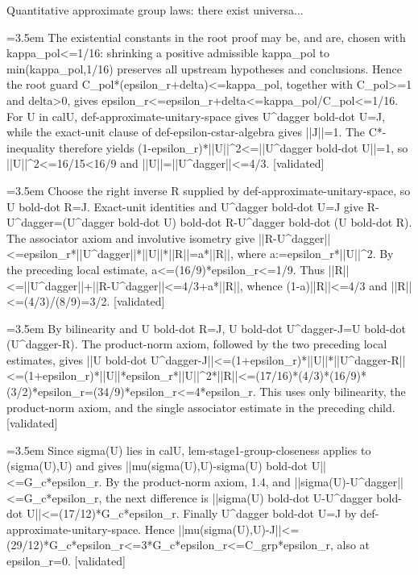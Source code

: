 \documentclass{article}
\newcommand{\step}[1]{\par\noindent\hangindent=3.5em\hangafter=1%
  \makebox[3.5em][l]{\textbf{#1.}}}
\newcommand{\steptag}[1]{\hfill{\small\textsf{[#1]}}}
\begin{document}
\begin{proofbox}{Quantitative approximate group laws: there exist universa...}
\step{1.6.1} The existential constants in the root proof may be, and are, chosen with kappa\_pol<=1/16: shrinking a positive admissible kappa\_pol to min(kappa\_pol,1/16) preserves all upstream hypotheses and conclusions. Hence the root guard C\_pol*(epsilon\_r+delta)<=kappa\_pol, together with C\_pol>=1 and delta>0, gives epsilon\_r<=epsilon\_r+delta<=kappa\_pol/C\_pol<=1/16. For U in calU, def-approximate-unitary-space gives U\textasciicircum{}dagger bold-dot U=J, while the exact-unit clause of def-epsilon-cstar-algebra gives ||J||=1. The C*-inequality therefore yields (1-epsilon\_r)*||U||\textasciicircum{}2<=||U\textasciicircum{}dagger bold-dot U||=1, so ||U||\textasciicircum{}2<=16/15<16/9 and ||U||=||U\textasciicircum{}dagger||<=4/3. \steptag{validated} \\[4pt]
\step{1.6.2} Choose the right inverse R supplied by def-approximate-unitary-space, so U bold-dot R=J. Exact-unit identities and U\textasciicircum{}dagger bold-dot U=J give R-U\textasciicircum{}dagger=(U\textasciicircum{}dagger bold-dot U) bold-dot R-U\textasciicircum{}dagger bold-dot (U bold-dot R). The associator axiom and involutive isometry give ||R-U\textasciicircum{}dagger||<=epsilon\_r*||U\textasciicircum{}dagger||*||U||*||R||=a*||R||, where a:=epsilon\_r*||U||\textasciicircum{}2. By the preceding local estimate, a<=(16/9)*epsilon\_r<=1/9. Thus ||R||<=||U\textasciicircum{}dagger||+||R-U\textasciicircum{}dagger||<=4/3+a*||R||, whence (1-a)||R||<=4/3 and ||R||<=(4/3)/(8/9)=3/2. \steptag{validated} \\[4pt]
\step{1.6.3} By bilinearity and U bold-dot R=J, U bold-dot U\textasciicircum{}dagger-J=U bold-dot (U\textasciicircum{}dagger-R). The product-norm axiom, followed by the two preceding local estimates, gives ||U bold-dot U\textasciicircum{}dagger-J||<=(1+epsilon\_r)*||U||*||U\textasciicircum{}dagger-R||<=(1+epsilon\_r)*||U||*epsilon\_r*||U||\textasciicircum{}2*||R||<=(17/16)*(4/3)*(16/9)*(3/2)*epsilon\_r=(34/9)*epsilon\_r<=4*epsilon\_r. This uses only bilinearity, the product-norm axiom, and the single associator estimate in the preceding child. \steptag{validated} \\[4pt]
\step{1.7} Since sigma(U) lies in calU, lem-stage1-group-closeness applies to (sigma(U),U) and gives ||mu(sigma(U),U)-sigma(U) bold-dot U||<=G\_c*epsilon\_r. By the product-norm axiom, 1.4, and ||sigma(U)-U\textasciicircum{}dagger||<=G\_c*epsilon\_r, the next difference is ||sigma(U) bold-dot U-U\textasciicircum{}dagger bold-dot U||<=(17/12)*G\_c*epsilon\_r. Finally U\textasciicircum{}dagger bold-dot U=J by def-approximate-unitary-space. Hence ||mu(sigma(U),U)-J||<=(29/12)*G\_c*epsilon\_r<=3*G\_c*epsilon\_r<=C\_grp*epsilon\_r, also at epsilon\_r=0. \steptag{validated} \\[4pt]

\end{proofbox}
\end{document}
